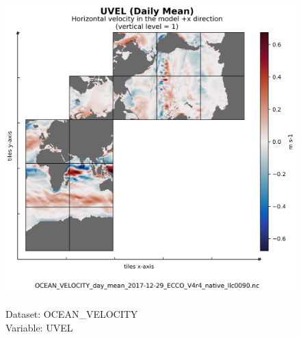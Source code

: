 \begin{longtable}{|p{}|p{}|p{}|p{}|}
\end{longtable}

\begin{figure}[H]
\centering
\includegraphics[scale=0.5]{../images/plots/native_plots/Ocean_Velocity/UVEL.png}
\caption{\\Dataset: OCEAN\_VELOCITY\\Variable: UVEL}
\label{tab:table-OCEAN_VELOCITY_UVEL-Plot}
\end{figure}
\pagebreak
